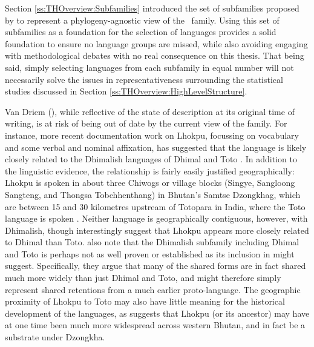 Section \ref{ss:THOverview:Subfamilies} introduced the set of subfamilies proposed by  to represent a phylogeny-agnostic view of the \lfam\ family. Using this set of subfamilies as a foundation for the selection of languages provides a solid foundation to ensure no language groups are missed, while also avoiding engaging with methodological debates with no real consequence on this thesis. That being said, simply selecting languages from each subfamily in equal number will not necessarily solve the issues in representativeness surrounding the statistical studies discussed in Section \ref{ss:THOverview:HighLevelStructure}.


Van Driem (\citeyear{VanDriem2014}), while reflective of the state of description at its original time of writing, is at risk of being out of date by the current view of the family. For instance, more recent documentation work on Lhokpu, focussing on vocabulary and some verbal and nominal affixation, has suggested that the language is likely closely related to the Dhimalish languages of Dhimal and Toto \cite{Grollmann2018}. In addition to the linguistic evidence, the relationship is fairly easily justified geographically: Lhokpu is spoken in about three Chiwogs or village blocks (Singye, Sangloong Sangteng, and Thongsa Tobchhenthang) in Bhutan's Samtse Dzongkhag, which are between 15 and 30 kilometres upstream of Totopara in India, where the Toto language is spoken \cite{Basumatary2016}. Neither language is geographically contiguous, however, with Dhimalish, though interestingly  suggest that Lhokpu appears more closely related to Dhimal than Toto.  also note that the Dhimalish subfamily including Dhimal and Toto is perhaps not as well proven or established as its inclusion in  might suggest. Specifically, they argue that many of the shared forms are in fact shared much more widely than just Dhimal and Toto, and might therefore simply represent shared retentions from a much earlier proto-language. The geographic proximity of Lhokpu to Toto may also have little meaning for the historical development of the languages, as  suggests that Lhokpu (or its ancestor) may have at one time been much more widespread across western Bhutan, and in fact be a substrate under Dzongkha.

